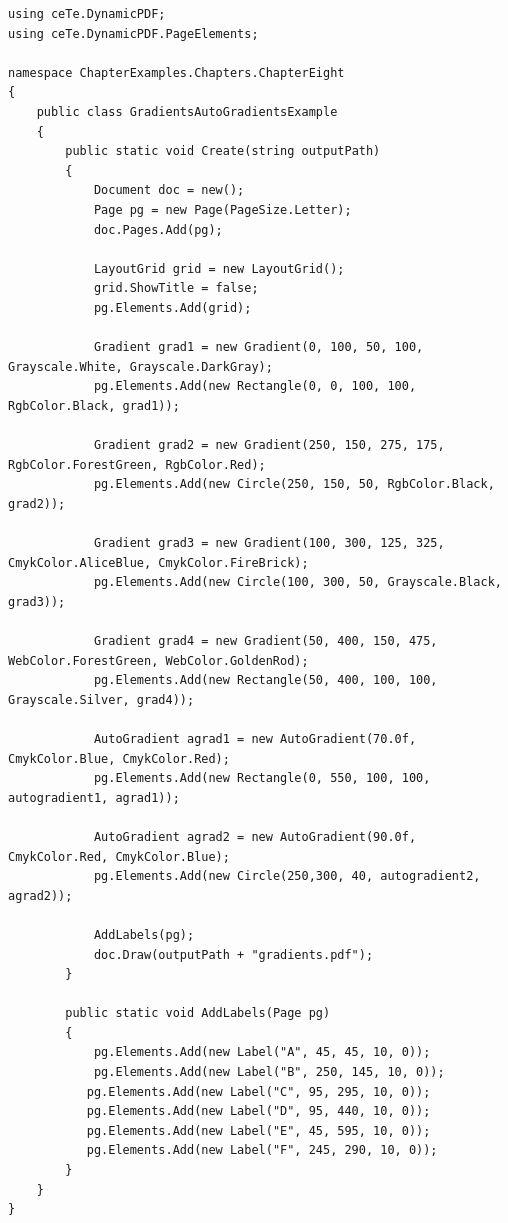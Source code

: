 \documentclass[american]{tufte-book}
\numberwithin{equation}{section}
\numberwithin{figure}{section}
\begin{document}
{\bgroup{}
\begin{lstlisting}[caption={Gradients in a PDF document.},label={lis:Gradients-in-a},basicstyle={\footnotesize\ttfamily},breaklines=true]
using ceTe.DynamicPDF;
using ceTe.DynamicPDF.PageElements;

namespace ChapterExamples.Chapters.ChapterEight
{
    public class GradientsAutoGradientsExample
    {
        public static void Create(string outputPath)
        {
            Document doc = new();
            Page pg = new Page(PageSize.Letter);
            doc.Pages.Add(pg);

            LayoutGrid grid = new LayoutGrid();
            grid.ShowTitle = false;
            pg.Elements.Add(grid);

            Gradient grad1 = new Gradient(0, 100, 50, 100, Grayscale.White, Grayscale.DarkGray);
            pg.Elements.Add(new Rectangle(0, 0, 100, 100, RgbColor.Black, grad1));
            
            Gradient grad2 = new Gradient(250, 150, 275, 175, RgbColor.ForestGreen, RgbColor.Red);
            pg.Elements.Add(new Circle(250, 150, 50, RgbColor.Black, grad2));
            
            Gradient grad3 = new Gradient(100, 300, 125, 325, CmykColor.AliceBlue, CmykColor.FireBrick);
            pg.Elements.Add(new Circle(100, 300, 50, Grayscale.Black, grad3));
           
            Gradient grad4 = new Gradient(50, 400, 150, 475, WebColor.ForestGreen, WebColor.GoldenRod);
            pg.Elements.Add(new Rectangle(50, 400, 100, 100, Grayscale.Silver, grad4));
            
            AutoGradient agrad1 = new AutoGradient(70.0f, CmykColor.Blue, CmykColor.Red);            
            pg.Elements.Add(new Rectangle(0, 550, 100, 100, autogradient1, agrad1));
            
            AutoGradient agrad2 = new AutoGradient(90.0f, CmykColor.Red, CmykColor.Blue);
            pg.Elements.Add(new Circle(250,300, 40, autogradient2, agrad2));

            AddLabels(pg);
            doc.Draw(outputPath + "gradients.pdf");
        }

        public static void AddLabels(Page pg)
        {
            pg.Elements.Add(new Label("A", 45, 45, 10, 0));
            pg.Elements.Add(new Label("B", 250, 145, 10, 0));
           pg.Elements.Add(new Label("C", 95, 295, 10, 0));
           pg.Elements.Add(new Label("D", 95, 440, 10, 0));
           pg.Elements.Add(new Label("E", 45, 595, 10, 0));
           pg.Elements.Add(new Label("F", 245, 290, 10, 0));
        }
    }
}
\end{lstlisting}
\leavevmode\egroup


}
\end{document}
